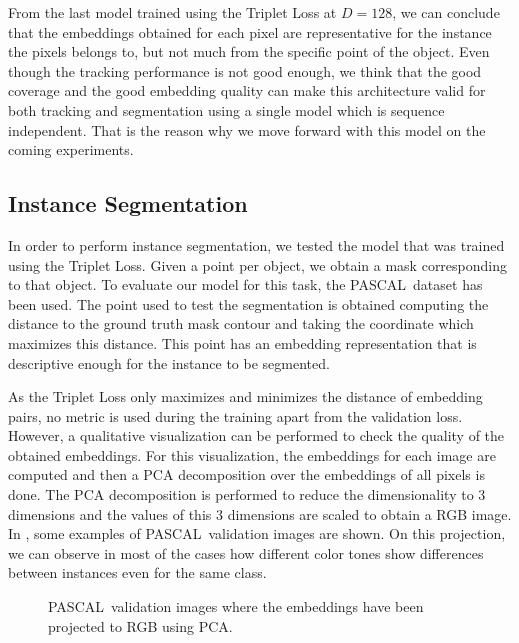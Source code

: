 From the last model trained using the Triplet Loss at $D=128$, we can conclude that the embeddings obtained for each pixel are representative for the instance the pixels belongs to, but not much from the specific point of the object.
Even though the tracking performance is not good enough, we think that the good coverage and the good embedding quality can make this architecture valid for both tracking and segmentation using a single model which is sequence independent.
That is the reason why we move forward with this model on the coming experiments.



\subsection{Instance Segmentation}

In order to perform instance segmentation, we tested the model that was trained using the Triplet Loss.
Given a point per object, we obtain a mask corresponding to that object.
To evaluate our model for this task, the PASCAL~\pascal dataset has been used.
The point used to test the segmentation is obtained computing the distance to the ground truth mask contour and taking the coordinate which maximizes this distance.
This point has an embedding representation that is descriptive enough for the instance to be segmented.

As the Triplet Loss only maximizes and minimizes the distance of embedding pairs, no metric is used during the training apart from the validation loss.
However, a qualitative visualization can be performed to check the quality of the obtained embeddings.
For this visualization, the embeddings for each image are computed  and then a PCA decomposition over the embeddings of all pixels is done.
The PCA decomposition is performed to reduce the dimensionality to 3 dimensions and the values of this 3 dimensions are scaled to obtain a RGB image.
In , some examples of PASCAL~\pascal validation images are shown.
On this projection, we can observe in most of the cases how different color tones show differences between instances even for the same class.

\begin{figure}[h]
  \centering
  \caption{PASCAL~\pascal validation images where the embeddings have been projected to RGB using PCA.}
  \label{fig:pca_embeddings}
\end{figure}

